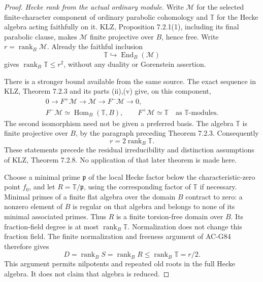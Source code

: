 \begin{proof}
\emph{Hecke rank from the actual ordinary module.}
Write \(\mathcal M\) for the selected finite-character component
of ordinary parabolic cohomology and \(\mathbb T\) for the
Hecke algebra acting faithfully on it. KLZ, Proposition
7.2.1(1), including its final parabolic clause, makes
\(\mathcal M\) finite projective over \(B\), hence free. Write
\(r=\operatorname{rank}_B\mathcal M\).
Already the faithful inclusion
\[
 \mathbb T\hookrightarrow\operatorname{End}_B(\mathcal M)
 \tag{G88.9}
\]
gives \(\operatorname{rank}_B\mathbb T\leq r^2\), without any
duality or Gorenstein assertion.

There is a stronger bound available from the same source.
The exact sequence in KLZ, Theorem 7.2.3 and its parts (ii),(v)
give, on this component,
\[
 \begin{gathered}
 0\longrightarrow F^+\mathcal M\longrightarrow\mathcal M
     \longrightarrow F^-\mathcal M\longrightarrow0,\\
 F^-\mathcal M\simeq\operatorname{Hom}_B(\mathbb T,B),
 \qquad F^+\mathcal M\simeq\mathbb T
       \quad\text{as }\mathbb T\text{-modules}.
 \end{gathered}
 \tag{G88.10}
\]
The second isomorphism need not be given a preferred basis.
The algebra \(\mathbb T\) is finite projective over \(B\), by the
paragraph preceding Theorem 7.2.3. Consequently
\[
 r=2\operatorname{rank}_B\mathbb T.
 \tag{G88.11}
\]
These statements precede the residual irreducibility and
distinction assumptions of KLZ, Theorem 7.2.8. No application of
that later theorem is made here.

Choose a minimal prime \(\mathfrak p\) of the local Hecke factor
below the characteristic-zero point \(f_0\), and let
\(R=\mathbb T/\mathfrak p\), using the corresponding factor of
\(\mathbb T\) if necessary. Minimal primes of a finite flat
algebra over the domain \(B\) contract to zero: a nonzero element
of \(B\) is regular on that algebra and belongs to none of its
minimal associated primes. Thus \(R\) is a finite torsion-free
domain over \(B\). Its fraction-field degree is at most
\(\operatorname{rank}_B\mathbb T\).
Normalization does not change this fraction field. The finite
normalization and freeness argument of AC-G84 therefore gives
\[
 D=\operatorname{rank}_B S
  =\operatorname{rank}_B R
  \leq\operatorname{rank}_B\mathbb T=r/2.
 \tag{G88.12}
\]
This argument permits nilpotents and repeated old roots in the
full Hecke algebra. It does not claim that algebra is reduced.


\end{proof}
